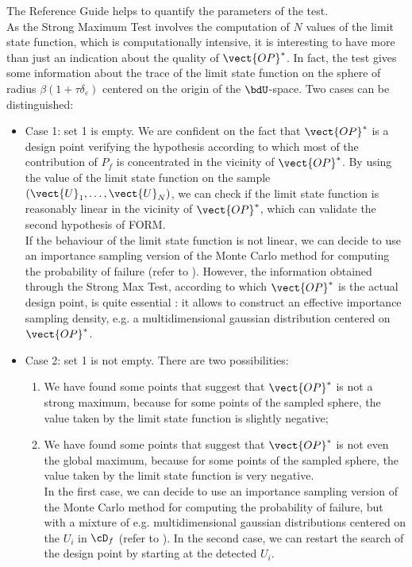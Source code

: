 The Reference Guide helps to quantify the parameters of the test.\\

As the Strong Maximum Test involves the computation of $N$ values of the limit state function, which is computationally intensive, it is interesting to have more than just an indication about the quality of $\vect{OP}^*$. In fact, the test gives some information about the trace of the limit state function on the sphere of radius $\beta(1+\tau \delta_{\varepsilon})$ centered on the origin of the $\bdU$-space. Two cases can be distinguished:
\begin{itemize}
\item Case 1: set 1 is empty. We are confident on the fact that $\vect{OP}^*$ is a design point verifying the hypothesis according to which most of the contribution of $P_f$ is concentrated in the vicinity of $\vect{OP}^*$. By using the value of the limit state function on the sample $(\vect{U}_1, \dots, \vect{U}_N)$, we can check if the limit state function is reasonably linear in the vicinity of $\vect{OP}^*$, which can validate the second hypothesis of FORM. \\
  If the behaviour of the limit state function is not linear, we can decide to use an importance sampling version of the Monte Carlo method for computing the probability of failure (refer to ). However, the information obtained through the Strong Max Test, according to which $\vect{OP}^*$ is the actual design point, is quite essential : it allows to construct an effective importance sampling density, e.g. a multidimensional gaussian distribution centered on $\vect{OP}^*$.
\item Case 2:   set 1 is not empty. There are two possibilities:
  \begin{enumerate}
  \item We have found some points that suggest that $\vect{OP}^*$ is not a strong maximum, because for some points of the sampled sphere, the value taken by the limit state function is slightly negative;
  \item We have found some points that suggest that $\vect{OP}^*$ is not even the global maximum, because for some points of the sampled sphere, the value taken by the limit state function is very negative.\\
    In the first case, we can decide to use an importance sampling version of the Monte Carlo method for computing the probability of failure, but with a mixture of e.g. multidimensional gaussian distributions centered on the $U_i$ in $\cD_f$ (refer to ).
    In the second case, we can restart the search of the design point by starting at the detected $U_i$.
  \end{enumerate}
\end{itemize}

